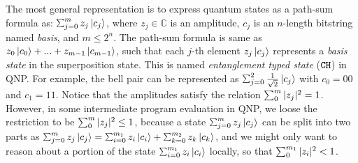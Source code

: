 The most general representation is to express quantum states as a path-sum formula as: $\sch{m}{z_j}{c_j}$, where $z_j\in \mathbb{C}$ is an amplitude, $c_j$ is an $n$-length bitstring named \emph{basis}, and $m \le 2^n$. The path-sum formula is same as ${z_0}\left\vert{c_0}\right\rangle+...+{z_{m-1}}\left\vert{c_{m-1}}\right\rangle$, such that each $j$-th element ${z_j}\left\vert{c_j}\right\rangle$ represents a \emph{basis state} in the superposition state. 
This is named \textit{entanglement typed state} ($\texttt{CH}$) in QNP.
For example, the bell pair can be represented as $\sch{2}{\frac{1}{\sqrt{2}}}{c_j}$ with $c_0=00$ and $c_1=11$.
Notice that the amplitudes satisfy the relation $\sum_{0}^{m}|z_j|^2 = 1$. However, in some intermediate program evaluation in QNP, we loose the restriction to be $\sum_{0}^{m}|z_j|^2 \le 1$, because a state $\sch{m}{z_j}{c_j}$ can be split into two parts as $\sch{m}{z_j}{c_j}=\schii{m_1}{z_i}{c_i}+\schk{m_2}{z_k}{c_k}$, and we might only want to reason about a portion of the state $\schii{m_1}{z_i}{c_i}$ locally, so that $\sum_{0}^{m_1}|z_i|^2 < 1$. 

